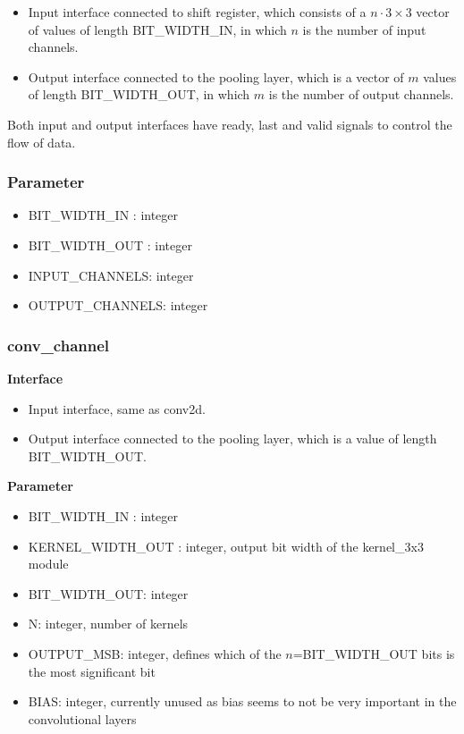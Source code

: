 \begin{itemize}
	\item Input interface connected to shift register, which consists of a $n \cdot 3 \times 3$ vector of values of length BIT\_WIDTH\_IN, in which $n$ is the number of input channels.
	\item Output interface connected to the pooling layer, which is a vector of $m$ values of length BIT\_WIDTH\_OUT, in which $m$ is the number of output channels.
\end{itemize}
Both input and output interfaces have ready, last and valid signals to control the flow of data.

\subsubsection{Parameter}

\begin{itemize}
 	\item BIT\_WIDTH\_IN : integer
 	\item BIT\_WIDTH\_OUT : integer
 	\item INPUT\_CHANNELS: integer
 	\item OUTPUT\_CHANNELS: integer
\end{itemize}



\subsubsection*{conv\_channel}


\textbf{Interface}
\begin{itemize}
	\item Input interface, same as conv2d.
	\item Output interface connected to the pooling layer, which is a value of length BIT\_WIDTH\_OUT.
\end{itemize}

\textbf{Parameter}
\begin{itemize}
 	\item BIT\_WIDTH\_IN : integer
 	\item KERNEL\_WIDTH\_OUT : integer, output bit width of the kernel\_3x3 module
 	\item BIT\_WIDTH\_OUT: integer
 	\item N: integer, number of kernels
 	\item OUTPUT\_MSB: integer, defines which of the $n$=BIT\_WIDTH\_OUT bits is the most significant bit
 	\item BIAS: integer, currently unused as bias seems to not be very important in the convolutional layers
\end{itemize}
